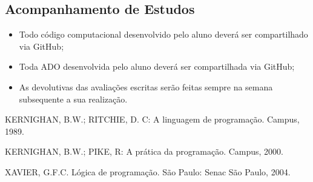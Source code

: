 \documentclass[a4paper]{article}
\begin{document}
        \subsection{Acompanhamento de Estudos}

            \begin{itemize}
                \item Todo código computacional desenvolvido pelo aluno
                      deverá ser compartilhado via GitHub;
                \item Toda ADO desenvolvida pelo aluno deverá ser compartilhada
                      via GitHub; 
                \item As devolutivas das avaliações escritas serão feitas
                      sempre na semana subsequente a sua realização.
            \end{itemize}

    \begin{thebibliography}{9}

         KERNIGHAN, B.W.; RITCHIE, D. C: A linguagem de
            programação. Campus, 1989.

         KERNIGHAN, B.W.; PIKE, R: A prática da programação.
            Campus, 2000.

         XAVIER, G.F.C. Lógica de programação. São Paulo:
            Senac São Paulo, 2004.

	\end{thebibliography}
\end{document}
